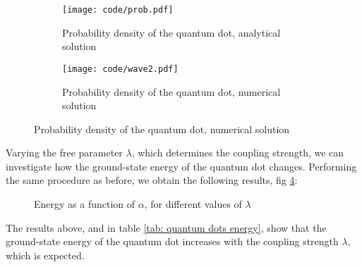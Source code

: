 \documentclass[a4paper]{article}
\newcommand{\w}{\omega}
\begin{document}
\begin{figure}[H]
    \centering
    \begin{subfigure}{0.45\textwidth}
    \texttt{[image: code/prob.pdf]}
    \caption{Probability density of the quantum dot, analytical solution}
    \label{fig: quantum dots wave-function}
    \end{subfigure}
    \hfill
    \begin{subfigure}{0.45\textwidth}
        \texttt{[image: code/wave2.pdf]}
        \caption{Probability density of the quantum dot, numerical solution}
        \label{fig: quantum dots wave-function numerical}
    \end{subfigure}
\end{figure}\noindent
Varying the free parameter $\lambda$, which determines the coupling strength, we can investigate how the ground-state energy of the quantum dot changes.
Performing the same procedure as before, we obtain the following results, fig \ref{fig: quantum dots: energy lambda}:
\begin{figure}
    \centering
    \caption{Energy as a function of $\alpha$, for different values of $\lambda$}
    \label{fig: quantum dots: energy lambda}
\end{figure}\noindent
The results above, and in table \ref{tab: quantum dots energy}, show that the ground-state energy of the quantum dot increases with the coupling strength $\lambda$, which is expected.
\end{document}
